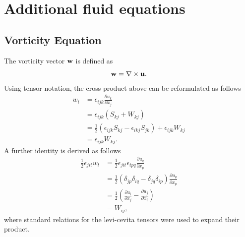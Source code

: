\documentclass[oneside,a4paper,11pt]{report}
\begin{document}
\chapter{Additional fluid equations}

\section{Vorticity Equation}

The vorticity vector $\mathbf{w}$ is defined as
\begin{equation}
\mathbf{w} = \nabla \times \mathbf{u}.
\end{equation}
Using tensor notation, the cross product above can be reformulated as follows
\begin{align}
w_i & = \epsilon_{ijk} \frac{\partial u_k}{\partial x_j} \nonumber \\
& = \epsilon_{ijk} (S_{kj} + W_{kj}) \nonumber \\
& = \frac{1}{2} (\epsilon_{ijk} S_{kj} - \epsilon_{ikj} S_{jk}) + \epsilon_{ijk} W_{kj} \nonumber \\
& = \epsilon_{ijk}W_{kj}.
\end{align}
A further identity is derived as follows
\begin{align}
\frac{1}{2} \epsilon_{jit} w_t &= \frac{1}{2} \epsilon_{jit} \epsilon_{tpq} \frac{\partial u_q}{\partial x_p} \nonumber \\
&= \frac{1}{2} (\delta_{jp} \delta_{iq} - \delta_{jq} \delta_{ip}) \frac{\partial u_q}{\partial x_p} \nonumber \\
&= \frac{1}{2} \left (\frac{\partial u_i}{\partial x_j} - \frac{\partial u_j}{\partial x_i} \right ) \nonumber \\
&= W_{ij},
\end{align}
where standard relations for the levi-cevita tensors were used to expand their product.
\end{document}
